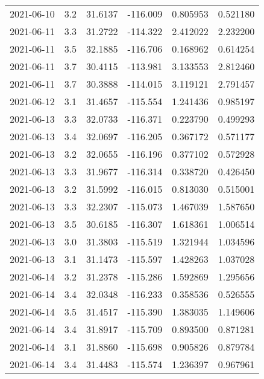 \begin{tabular}{lrrrrr}
2021-06-10 &       3.2 &  31.6137 &  -116.009 &         0.805953 &         0.521180 \\
2021-06-11 &       3.3 &  31.2722 &  -114.322 &         2.412022 &         2.232200 \\
2021-06-11 &       3.5 &  32.1885 &  -116.706 &         0.168962 &         0.614254 \\
2021-06-11 &       3.7 &  30.4115 &  -113.981 &         3.133553 &         2.812460 \\
2021-06-11 &       3.7 &  30.3888 &  -114.015 &         3.119121 &         2.791457 \\
2021-06-12 &       3.1 &  31.4657 &  -115.554 &         1.241436 &         0.985197 \\
2021-06-13 &       3.3 &  32.0733 &  -116.371 &         0.223790 &         0.499293 \\
2021-06-13 &       3.4 &  32.0697 &  -116.205 &         0.367172 &         0.571177 \\
2021-06-13 &       3.2 &  32.0655 &  -116.196 &         0.377102 &         0.572928 \\
2021-06-13 &       3.3 &  31.9677 &  -116.314 &         0.338720 &         0.426450 \\
2021-06-13 &       3.2 &  31.5992 &  -116.015 &         0.813030 &         0.515001 \\
2021-06-13 &       3.3 &  32.2307 &  -115.073 &         1.467039 &         1.587650 \\
2021-06-13 &       3.5 &  30.6185 &  -116.307 &         1.618361 &         1.006514 \\
2021-06-13 &       3.0 &  31.3803 &  -115.519 &         1.321944 &         1.034596 \\
2021-06-13 &       3.1 &  31.1473 &  -115.597 &         1.428263 &         1.037028 \\
2021-06-14 &       3.2 &  31.2378 &  -115.286 &         1.592869 &         1.295656 \\
2021-06-14 &       3.4 &  32.0348 &  -116.233 &         0.358536 &         0.526555 \\
2021-06-14 &       3.5 &  31.4517 &  -115.390 &         1.383035 &         1.149606 \\
2021-06-14 &       3.4 &  31.8917 &  -115.709 &         0.893500 &         0.871281 \\
2021-06-14 &       3.1 &  31.8860 &  -115.698 &         0.905826 &         0.879784 \\
2021-06-14 &       3.4 &  31.4483 &  -115.574 &         1.236397 &         0.967961 \\

\end{tabular}
